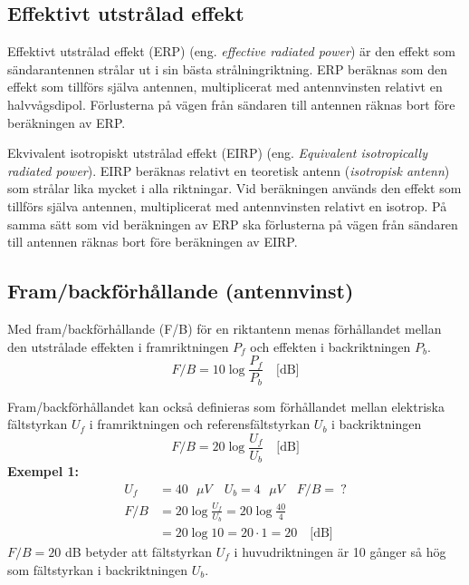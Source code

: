 \subsection{Effektivt utstrålad effekt}

Effektivt utstrålad effekt (ERP) (eng. \emph{effective radiated power}) är den
effekt som sändarantennen strålar ut i sin bästa strålningriktning.
ERP beräknas som den effekt som tillförs själva antennen, multiplicerat med
antennvinsten relativt en halvvågsdipol.
Förlusterna på vägen från sändaren till antennen räknas bort före beräkningen av
ERP.

Ekvivalent isotropiskt utstrålad effekt (EIRP)
(eng. \emph{Equivalent isotropically radiated power}).
EIRP beräknas relativt en teoretisk antenn (\emph{isotropisk antenn}) som
strålar lika mycket i alla riktningar.
Vid beräkningen används den effekt som tillförs själva antennen, multiplicerat
med antennvinsten relativt en isotrop.
På samma sätt som vid beräkningen av ERP ska förlusterna på vägen från sändaren
till antennen räknas bort före beräkningen av EIRP.

\subsection{Fram/backförhållande (antennvinst)}

Med fram/backförhållande (F/B) för en riktantenn menas förhållandet mellan den
utstrålade effekten i framriktningen \(P_f\) och effekten i backriktningen
\(P_b\).
\[ F/B = 10 \log\frac{P_f}{P_b} \quad \text{[dB]} \]

Fram/backförhållandet kan också definieras som förhållandet mellan elektriska
fältstyrkan \(U_f\) i framriktningen och referensfältstyrkan \(U_b\) i
backriktningen
\[ F/B = 20 \log\frac{U_f}{U_b} \quad \text{[dB]} \]
\textbf{Exempel 1:}
\begin{align*}
  U_f &= 40 \text{ \(\mu V\)} \quad U_b = 4\text{ \(\mu V\)} \quad F/B =\ ? \\
  F/B &= 20 \log\frac{U_f}{U_b} = 20 \log\frac{40}{4} \\
  &= 20 \log 10 = 20 \cdot 1 = 20 \quad \text{[dB]}
\end{align*}
\(F/B = 20\) dB betyder att fältstyrkan \(U_f\) i huvudriktningen är
10 gånger så hög som fältstyrkan i backriktningen \(U_b\).

